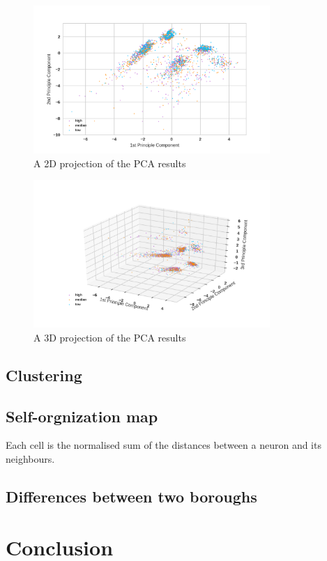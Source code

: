 \documentclass[12pt]{article}
\begin{document}
\begin{figure}[htb]
\centering
\includegraphics[width = 0.8\textwidth]{images/pca2-2d.png}
\caption{A 2D projection of the PCA results}
\label{fig:pca2-2d}
\end{figure}
\begin{figure}[htb]
\centering
\includegraphics[width = 0.8\textwidth]{images/pca2-3d.png}
\caption{A 3D projection of the PCA results}
\label{fig:pca2-3d}
\end{figure}
\subsection{Clustering}

\subsection{Self-orgnization map}


Each cell is the normalised sum of the distances between a neuron and its neighbours.

\subsection{Differences between two boroughs}
\section{Conclusion}

\newpage

\end{document}

